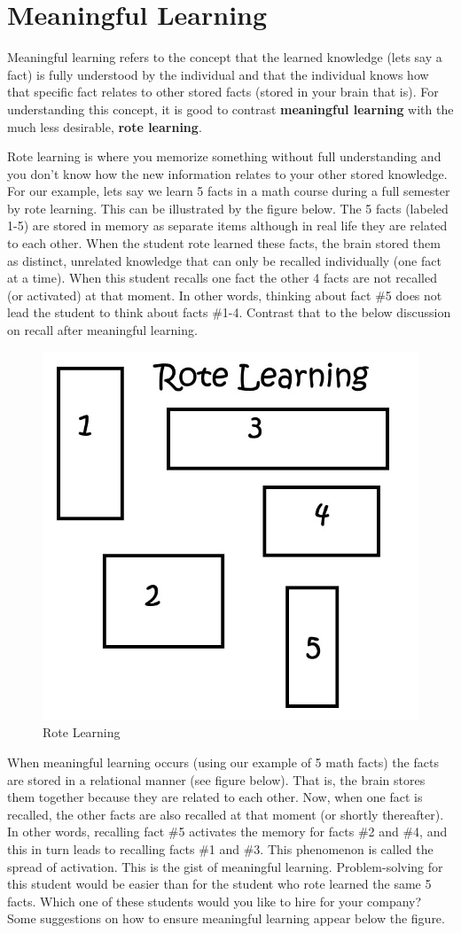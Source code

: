 \chapter{Meaningful Learning}

Meaningful learning refers to the concept that the learned knowledge (lets say a fact) is fully understood by the individual and that the individual knows how that specific fact relates to other stored facts (stored in your brain that is). For understanding this concept, it is good to contrast \textbf{meaningful learning} with the much less desirable, \textbf{rote learning}.

Rote learning is where you memorize something without full understanding and you don't know how the new information relates to your other stored knowledge. For our example, lets say we learn 5 facts in a math course during a full semester by rote learning. This can be illustrated by the figure below. The 5 facts (labeled 1-5) are stored in memory as separate items although in real life they are related to each other. When the student rote learned these facts, the brain stored them as distinct, unrelated knowledge that can only be recalled individually (one fact at a time). When this student recalls one fact the other 4 facts are not recalled (or activated) at that moment. In other words, thinking about fact \#5 does not lead the student to think about facts \#1-4. Contrast that to the below discussion on recall after meaningful learning.

\begin{figure}
	\centering
	\includegraphics[width=0.55\linewidth]{./images/mean1}
	\caption{Rote Learning}
	\label{fig:mean1}
\end{figure}

When meaningful learning occurs (using our example of 5 math facts) the facts are stored in a relational manner (see figure below). That is, the brain stores them together because they are related to each other. Now, when one fact is recalled, the other facts are also recalled at that moment (or shortly thereafter). In other words, recalling fact \#5 activates the memory for facts \#2 and \#4, and this in turn leads to recalling facts \#1 and \#3. This phenomenon is called the spread of activation. This is the gist of meaningful learning. Problem-solving for this student would be easier than for the student who rote learned the same 5 facts.  Which one of these students would you like to hire for your company? Some suggestions on how to ensure meaningful learning appear below the figure. 

